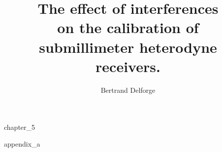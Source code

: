 \documentclass[a4paper,11pt]{book}
\title{
    The effect of interferences\\
    on the calibration of\\
    submillimeter heterodyne receivers.\\
}
\author{Bertrand Delforge}
\newif\ifDraft
\begin{document}
\pagestyle{fancy}

\frontmatter

\maketitle

\ifDraft
    \renewcommand*\contentsname{Content \today}
\fi

\tableofcontents

\mainmatter





{chapter_5}


\begin{appendices}
   {appendix_a}
\end{appendices}

\backmatter

%


\cleardoublepage
{}
\printbibliography
\end{document}
